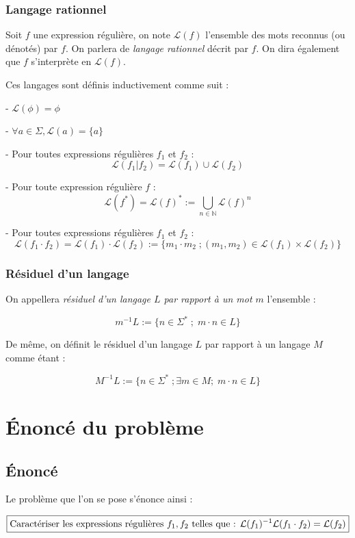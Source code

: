 \documentclass{article}
\begin{document}
\subsubsection{Langage rationnel}

Soit $f$ une expression régulière, on note $\mathcal{L}(f)$ l'ensemble des mots reconnus (ou dénotés) par $f$. On parlera de \textit{langage rationnel} décrit par $f$. On dira également que $f$ s'interprète en $\mathcal{L}(f)$. 

Ces langages sont définis inductivement comme suit :

- $\mathcal{L}(\phi) = \phi$

- $\forall a \in \Sigma, \mathcal{L}(a) = \{a\}$

- Pour toutes expressions régulières $f_1$ et $f_2$ :
$$\mathcal{L}(f_1 | f_2) = \mathcal{L}(f_1) \cup \mathcal{L}(f_2)$$

- Pour toute expression régulière $f$ : 
$$\mathcal{L}(f^*) = \mathcal{L}(f)^* := \bigcup_{n \in \mathbb{N}} \mathcal{L}(f)^n$$

- Pour toutes expressions régulières $f_1$ et $f_2$ :
$$\mathcal{L}(f_1 \cdot f_2) = \mathcal{L}(f_1) \cdot \mathcal{L}(f_2) := \{ m_1 \cdot m_2 \; ; (m_1,m_2) \in \mathcal{L}(f_1) \times \mathcal{L}(f_2) \}$$


\subsubsection{Résiduel d'un langage}

On appellera \textit{résiduel d'un langage $L$ par rapport à un mot $m$} l'ensemble :

$$m^{-1}L := \{n \in \Sigma^* \; ; \; m \cdot n \in L \}$$

De même, on définit le résiduel d'un langage $L$ par rapport à un langage $M$ comme étant :

$$M^{-1}L := \{ n \in \Sigma^* \; ; \exists m \in M ; \; m \cdot n \in L \}$$

\section{Énoncé du problème}

\subsection{Énoncé}

Le problème que l'on se pose s'énonce ainsi :

$$\boxed{\textup{Caractériser les expressions régulières }f_1,f_2 \textup{ telles que : } \mathcal{L}(f_1)^{-1}\mathcal{L}(f_1 \cdot f_2) = \mathcal{L}(f_2)}$$
\end{document}
